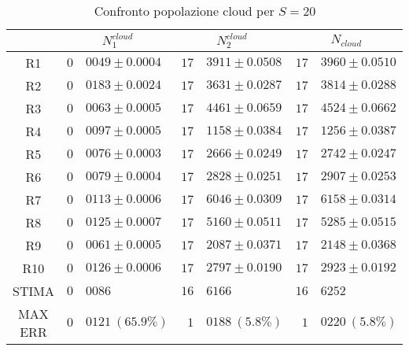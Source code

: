\begin{table}[!h]
\begin{tabular}{c|r@{.}l|r@{.}l|r@{.}l}
& \multicolumn{2}{|c|}{$N_1^{cloud}$}
& \multicolumn{2}{|c|}{$N_2^{cloud}$}
& \multicolumn{2}{|c}{$N_{cloud}$} 
\\          
\hline
R1      & $0$&$0049 \pm 0.0004$ & $17$&$3911 \pm 0.0508$ & $17$&$3960 \pm 0.0510$ \\
R2      & $0$&$0183 \pm 0.0024$ & $17$&$3631 \pm 0.0287$ & $17$&$3814 \pm 0.0288$ \\
R3      & $0$&$0063 \pm 0.0005$ & $17$&$4461 \pm 0.0659$ & $17$&$4524 \pm 0.0662$ \\
R4      & $0$&$0097 \pm 0.0005$ & $17$&$1158 \pm 0.0384$ & $17$&$1256 \pm 0.0387$ \\
R5      & $0$&$0076 \pm 0.0003$ & $17$&$2666 \pm 0.0249$ & $17$&$2742 \pm 0.0247$ \\
R6      & $0$&$0079 \pm 0.0004$ & $17$&$2828 \pm 0.0251$ & $17$&$2907 \pm 0.0253$ \\
R7      & $0$&$0113 \pm 0.0006$ & $17$&$6046 \pm 0.0309$ & $17$&$6158 \pm 0.0314$ \\
R8      & $0$&$0125 \pm 0.0007$ & $17$&$5160 \pm 0.0511$ & $17$&$5285 \pm 0.0515$ \\
R9      & $0$&$0061 \pm 0.0005$ & $17$&$2087 \pm 0.0371$ & $17$&$2148 \pm 0.0368$ \\
R10     & $0$&$0126 \pm 0.0006$ & $17$&$2797 \pm 0.0190$ & $17$&$2923 \pm 0.0192$ \\
STIMA   & $0$&$0086$            & $16$&$6166$            & $16$&$6252$            \\
MAX ERR & $0$&$0121 \ (65.9\%)$ & $1$&$0188 \ (5.8\%)$   & $1$&$0220 \ (5.8\%)$     
\end{tabular}
\centering
\caption{Confronto popolazione cloud per $S=20$}
\label{tab:20_ncloud}
\end{table}
